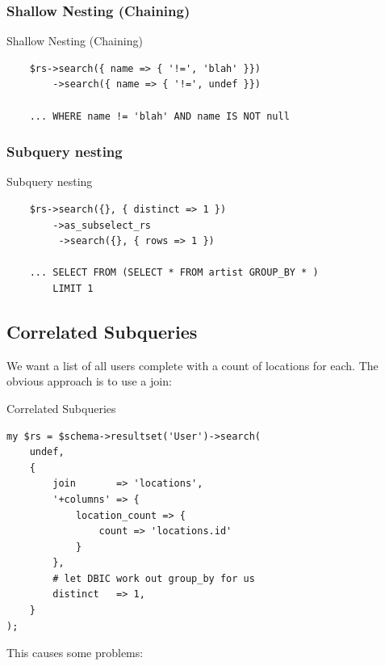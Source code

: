 
\subsubsection{Shallow Nesting (Chaining)}

\begin{frame}[fragile]{Shallow Nesting (Chaining)}
\begin{lstlisting}
    $rs->search({ name => { '!=', 'blah' }})
        ->search({ name => { '!=', undef }})

    ... WHERE name != 'blah' AND name IS NOT null
\end{lstlisting}
\end{frame}

\subsubsection{Subquery nesting}

\begin{frame}[fragile]{Subquery nesting}
\begin{lstlisting}
    $rs->search({}, { distinct => 1 })
        ->as_subselect_rs
         ->search({}, { rows => 1 })

    ... SELECT FROM (SELECT * FROM artist GROUP_BY * )
        LIMIT 1
\end{lstlisting}
\end{frame}

\subsection{Correlated Subqueries}

We want a list of all users complete with a count of locations for each. The
obvious approach is to use a join:

\begin{frame}[fragile]{Correlated Subqueries}
\begin{lstlisting}
my $rs = $schema->resultset('User')->search(
    undef,
    {
        join       => 'locations',
        '+columns' => {
            location_count => {
                count => 'locations.id'
            }
        },
        # let DBIC work out group_by for us
        distinct   => 1,    
    }
);
\end{lstlisting}
\end{frame}

This causes some problems:

